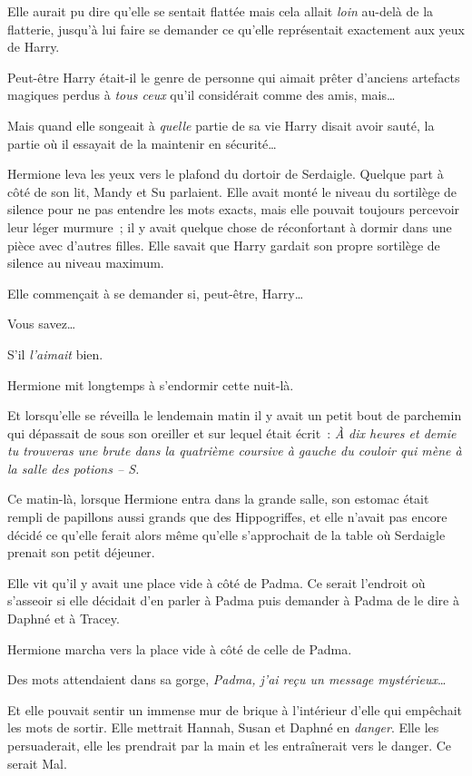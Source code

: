 Elle aurait pu dire qu'elle se sentait flattée mais cela allait \emph{loin} au-delà de la flatterie, jusqu'à lui faire se demander ce qu'elle représentait exactement aux yeux de Harry.

Peut-être Harry était-il le genre de personne qui aimait prêter d'anciens artefacts magiques perdus à \emph{tous ceux} qu'il considérait comme des amis, mais…

Mais quand elle songeait à \emph{quelle} partie de sa vie Harry disait avoir sauté, la partie où il essayait de la maintenir en sécurité…

Hermione leva les yeux vers le plafond du dortoir de Serdaigle. Quelque part à côté de son lit, Mandy et Su parlaient. Elle avait monté le niveau du sortilège de silence pour ne pas entendre les mots exacts, mais elle pouvait toujours percevoir leur léger murmure~; il y avait quelque chose de réconfortant à dormir dans une pièce avec d'autres filles. Elle savait que Harry gardait son propre sortilège de silence au niveau maximum.

Elle commençait à se demander si, peut-être, Harry…

Vous savez…

S'il \emph{l'aimait} bien.

Hermione mit longtemps à s'endormir cette nuit-là.

Et lorsqu'elle se réveilla le lendemain matin il y avait un petit bout de parchemin qui dépassait de sous son oreiller et sur lequel était écrit~: \emph{À dix heures et demie tu trouveras une brute dans la quatrième coursive à gauche du couloir qui mène à la salle des potions -- S.}

\later

Ce matin-là, lorsque Hermione entra dans la grande salle, son estomac était rempli de papillons aussi grands que des Hippogriffes, et elle n'avait pas encore décidé ce qu'elle ferait alors même qu'elle s'approchait de la table où Serdaigle prenait son petit déjeuner.

Elle vit qu'il y avait une place vide à côté de Padma. Ce serait l'endroit où s'asseoir si elle décidait d'en parler à Padma puis demander à Padma de le dire à Daphné et à Tracey.

Hermione marcha vers la place vide à côté de celle de Padma.

Des mots attendaient dans sa gorge, \emph{Padma, j'ai reçu un message mystérieux}…

Et elle pouvait sentir un immense mur de brique à l'intérieur d'elle qui empêchait les mots de sortir. Elle mettrait Hannah, Susan et Daphné en \emph{danger}. Elle les persuaderait, elle les prendrait par la main et les entraînerait vers le danger. Ce serait Mal.

